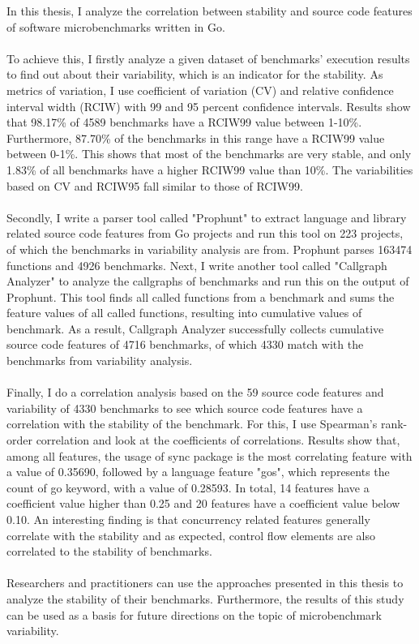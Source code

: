 \documentclass{seal_thesis}
\begin{document}
In this thesis, I analyze the correlation between stability and source code features of software microbenchmarks written in Go.\\
\\
To achieve this, I firstly analyze a given dataset of benchmarks' execution results to find out about their variability, which is an indicator for the stability. As metrics of variation, I use coefficient of variation (CV) and relative confidence interval width (RCIW) with 99 and 95 percent confidence intervals. Results show that 98.17\% of 4589 benchmarks have a RCIW99 value between 1-10\%. Furthermore, 87.70\% of the benchmarks in this range have a RCIW99 value between 0-1\%. This shows that most of the benchmarks are very stable, and only 1.83\% of all benchmarks have a higher RCIW99 value than 10\%. The variabilities based on CV and RCIW95 fall similar to those of RCIW99.\\
\\
Secondly, I write a parser tool called "Prophunt" to extract language and library related source code features from Go projects and run this tool on 223 projects, of which the benchmarks in variability analysis are from. Prophunt parses 163474 functions and 4926 benchmarks. Next, I write another tool called "Callgraph Analyzer" to analyze the callgraphs of benchmarks and run this on the output of Prophunt. This tool finds all called functions from a benchmark and sums the feature values of all called functions, resulting into cumulative values of benchmark. As a result, Callgraph Analyzer successfully collects cumulative source code features of 4716 benchmarks, of which 4330 match with the benchmarks from variability analysis.\\
\\
Finally, I do a correlation analysis based on the 59 source code features and variability of 4330 benchmarks to see which source code features have a correlation with the stability of the benchmark. For this, I use Spearman's rank-order correlation and look at the coefficients of correlations. Results show that, among all features, the usage of sync package is the most correlating feature with a value of 0.35690, followed by a language feature "gos", which represents the count of go keyword, with a value of 0.28593. In total, 14 features have a coefficient value higher than 0.25 and 20 features have a coefficient value below 0.10. An interesting finding is that concurrency related features generally correlate with the stability and as expected, control flow elements are also correlated to the stability of benchmarks.\\
\\
Researchers and practitioners can use the approaches presented in this thesis to analyze the stability of their benchmarks. Furthermore, the results of this study can be used as a basis for future directions on the topic of microbenchmark variability.
\end{document}
